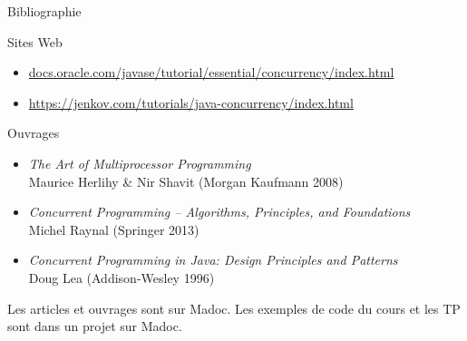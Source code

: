 
\begingroup

\begin{frame}{Bibliographie}

  \begin{block}{Sites Web}
    \begin{itemize}
    \item \href{http://docs.oracle.com/javase/tutorial/essential/concurrency/index.html}{docs.oracle.com/javase/tutorial/essential/concurrency/index.html}
    \item \href{https://jenkov.com/tutorials/java-concurrency/index.html}{https://jenkov.com/tutorials/java-concurrency/index.html}
    \end{itemize}
  \end{block}

  \vfill

  \begin{block}{Ouvrages}
    \begin{itemize}
    \item \textit{The Art of Multiprocessor Programming}\\ Maurice Herlihy \& Nir Shavit (Morgan Kaufmann 2008)
    \item \textit{Concurrent Programming -- Algorithms, Principles, and Foundations}\\ Michel Raynal (Springer 2013)
    \item \textit{Concurrent Programming in Java: Design Principles and Patterns}\\ Doug Lea (Addison-Wesley 1996)
    \end{itemize}
  \end{block}
  
  \vfill
  \vfill
  
  \begin{citing}
  \item Les articles et ouvrages sont sur Madoc.
    \jitem Les exemples de code du cours et les TP sont dans un projet sur Madoc.
  \end{citing}

\end{frame}

\endgroup
\endinput
